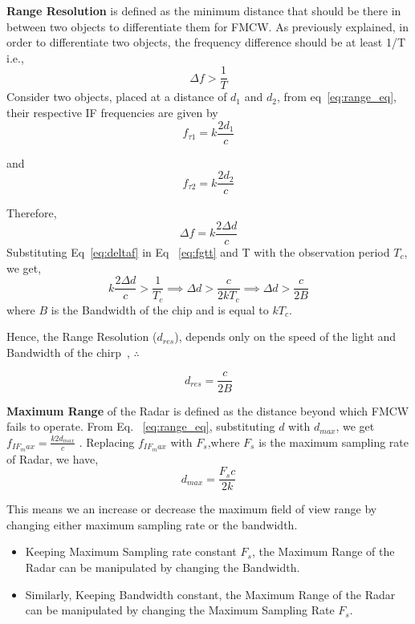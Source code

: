 \textbf{Range Resolution} is defined as the minimum distance that should be there in between two objects to differentiate them for FMCW. As previously explained, in order to differentiate two objects, the frequency difference should be at least 1/T i.e., 
\begin{equation}\label{eq:fgtt}
 \Delta f > \frac{1}{T}  
\end{equation}Consider two objects, placed at a distance of $d_{1}$ and $d_{2}$, from eq~\ref{eq:range_eq}, their respective IF frequencies are given by
 \begin{equation}
   f_{\tau1}= k\frac{2d_{1}}{c}
 \end{equation} 
 
 and
  \begin{equation}
   f_{\tau2}= k\frac{2d_{2}}{c}
 \end{equation} 
 
 Therefore, 
 \begin{equation}\label{eq:deltaf}
     \Delta f = k\frac{2\Delta d}{c}
 \end{equation}
Substituting Eq~\ref{eq:deltaf} in Eq ~\ref{eq:fgtt} and T with the observation period $T_{c}$, we get,
\begin{equation}
  k\frac{2\Delta d}{c} > \frac{1}{T_{c}}  \implies \Delta d > \frac{c}{2kT_{c}} \implies \Delta d > \frac{c}{2B}  
\end{equation}
where $B$ is the Bandwidth of the chip and is equal to $kT_{c}$.

Hence, the Range Resolution ($d_{res}$), depends only on the speed of the light and Bandwidth of the chirp~\cite{rao_2017}, $\therefore$ 

\begin{equation}
   d_{res} = \frac{c}{2B} 
\end{equation}

\textbf{Maximum Range} of the Radar is defined as the distance beyond which FMCW fails to operate. From Eq. ~\ref{eq:range_eq}, substituting $d$ with $d_{max}$, we get \(f_{IF_max} = \frac{k2d_{max}}{c}\) . Replacing $f_{IF_max}$ with $F_{s}$,where $F_{s}$ is the maximum sampling rate of Radar, we have,
\begin{equation}
    d_{max}= \frac{F_{s}c}{2k}
\end{equation}

This means we an increase or decrease the maximum field of view range by changing either maximum sampling rate or the bandwidth.
\begin{itemize}
    \item Keeping Maximum Sampling rate constant $F_{s}$, the Maximum Range of the Radar can be manipulated by changing the Bandwidth.
    \item Similarly,  Keeping Bandwidth constant, the Maximum Range of the Radar can be manipulated by changing the Maximum Sampling Rate $F_{s}$.
\end{itemize}



